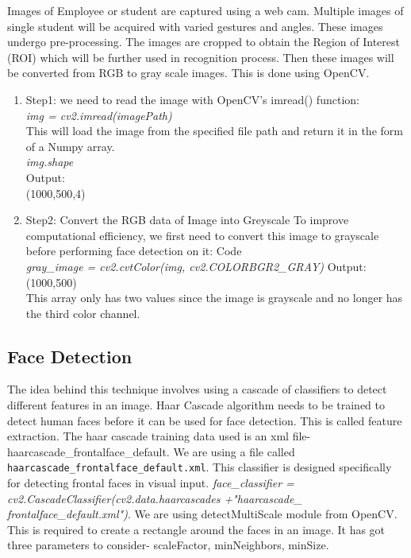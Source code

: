  Images of Employee or student are captured using a web cam. Multiple images of single student will be acquired with varied gestures and  angles.  These  images  undergo  pre-processing.  The images  are cropped  to obtain  the  Region of  Interest (ROI) which will be further used in recognition process. Then these  images  will  be  converted  from  RGB  to  gray  scale images. This is done using OpenCV. 
\begin{enumerate}
    \item Step1: we need to read the image with OpenCV’s imread() function:
    \\
  \emph{img = cv2.imread(imagePath)} \\
    This will load the image from the specified file path and return it in the form of a Numpy array. \\
   \emph{img.shape} \\
    Output:\\
    (1000,500,4)
    \item Step2: Convert the RGB data of Image into Greyscale
    To improve computational efficiency, we first need to convert this image to grayscale before performing face detection on it:
    Code \\
   \emph{gray\_image = cv2.cvtColor(img, cv2.COLORBGR2\_GRAY)} 
    Output:
    \\
    (1000,500)\\
    This array only has two values since the image is grayscale and no longer has the third color channel.
\end{enumerate}

  \subsection{Face Detection}
The idea behind this technique involves using a cascade of classifiers to detect different features in an image. Haar Cascade algorithm needs to be trained to  detect human  faces before it can be used for  face detection. This is called feature extraction. The haar cascade training  data  used  is  an  xml  file- haarcascade\_frontalface\_default. We are using a file called \verb|haarcascade_frontalface_|\linebreak\verb|default.xml|.
This classifier is designed specifically for detecting frontal faces in visual input. \emph{face\_classifier = cv2.CascadeClassifier(cv2.data.haarcascades +"haarcascade\_ frontalface\_default.xml")}. We are using detectMultiScale module from OpenCV. This is required to create a rectangle around  the faces  in an image.  It has got three  parameters to  consider-  scaleFactor, minNeighbors, minSize.

